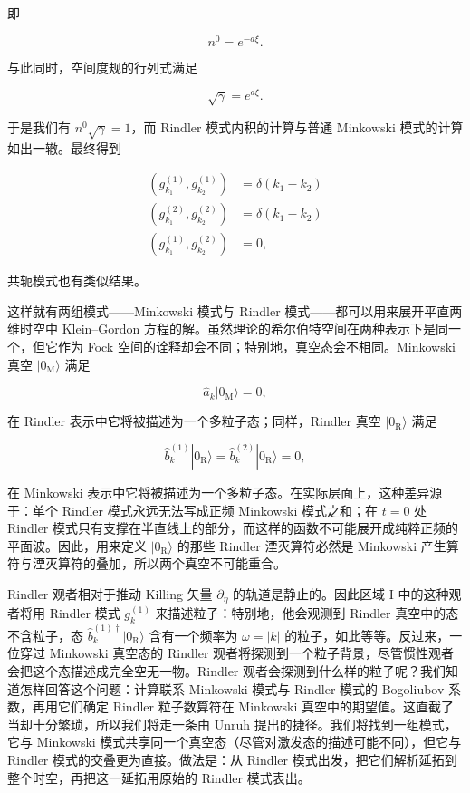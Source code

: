 即

\begin{equation*}
n^{0} = e^{-a\xi}.
\tag{9.146}
\end{equation*}

与此同时，空间度规的行列式满足

\begin{equation*}
\sqrt{\gamma} = e^{a\xi}.
\tag{9.147}
\end{equation*}

于是我们有 $n^{0}\sqrt{\gamma}=1$，而 Rindler 模式内积的计算与普通 Minkowski 模式的计算如出一辙。最终得到

\begin{align*}
(g_{k_1}^{(1)}, g_{k_2}^{(1)}) &= \delta(k_1 - k_2) \\
(g_{k_1}^{(2)}, g_{k_2}^{(2)}) &= \delta(k_1 - k_2) \\
(g_{k_1}^{(1)}, g_{k_2}^{(2)}) &= 0,
\tag{9.148}
\end{align*}

共轭模式也有类似结果。

这样就有两组模式——Minkowski 模式与 Rindler 模式——都可以用来展开平直两维时空中 Klein--Gordon 方程的解。虽然理论的希尔伯特空间在两种表示下是同一个，但它作为 Fock 空间的诠释却会不同；特别地，真空态会不相同。Minkowski 真空 $|0_{\mathrm{M}}\rangle$ 满足

\begin{equation*}
\hat{a}_{k}|0_{\mathrm{M}}\rangle = 0,
\tag{9.149}
\end{equation*}

在 Rindler 表示中它将被描述为一个多粒子态；同样，Rindler 真空 $|0_{\mathrm{R}}\rangle$ 满足

\begin{equation*}
\hat{b}_{k}^{(1)}|0_{\mathrm{R}}\rangle = \hat{b}_{k}^{(2)}|0_{\mathrm{R}}\rangle = 0,
\tag{9.150}
\end{equation*}

在 Minkowski 表示中它将被描述为一个多粒子态。在实际层面上，这种差异源于：单个 Rindler 模式永远无法写成正频 Minkowski 模式之和；在 $t=0$ 处 Rindler 模式只有支撑在半直线上的部分，而这样的函数不可能展开成纯粹正频的平面波。因此，用来定义 $|0_{\mathrm{R}}\rangle$ 的那些 Rindler 湮灭算符必然是 Minkowski 产生算符与湮灭算符的叠加，所以两个真空不可能重合。

Rindler 观者相对于推动 Killing 矢量 $\partial_{\eta}$ 的轨道是静止的。因此区域 I 中的这种观者将用 Rindler 模式 $g_{k}^{(1)}$ 来描述粒子：特别地，他会观测到 Rindler 真空中的态不含粒子，态 $\hat{b}_{k}^{(1)\dagger}|0_{\mathrm{R}}\rangle$ 含有一个频率为 $\omega=|k|$ 的粒子，如此等等。反过来，一位穿过 Minkowski 真空态的 Rindler 观者将探测到一个粒子背景，尽管惯性观者会把这个态描述成完全空无一物。Rindler 观者会探测到什么样的粒子呢？我们知道怎样回答这个问题：计算联系 Minkowski 模式与 Rindler 模式的 Bogoliubov 系数，再用它们确定 Rindler 粒子数算符在 Minkowski 真空中的期望值。这直截了当却十分繁琐，所以我们将走一条由 Unruh 提出的捷径。我们将找到一组模式，它与 Minkowski 模式共享同一个真空态（尽管对激发态的描述可能不同），但它与 Rindler 模式的交叠更为直接。做法是：从 Rindler 模式出发，把它们解析延拓到整个时空，再把这一延拓用原始的 Rindler 模式表出。

